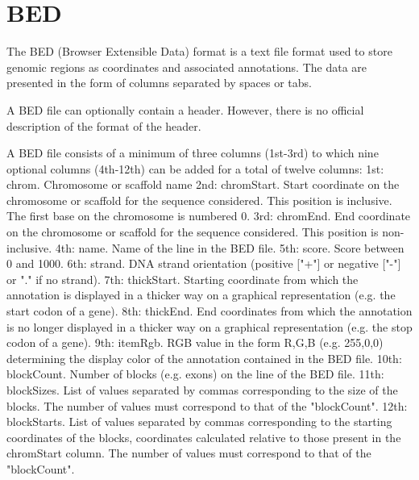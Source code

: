 \documentclass[11pt]{article}
\begin{document}
\section{BED}
The BED (Browser Extensible Data) format is a text file format used to store genomic regions as coordinates and associated annotations. 
The data are presented in the form of columns separated by spaces or tabs.

\newline

A BED file can optionally contain a header. 
However, there is no official description of the format of the header.

\newline

A BED file consists of a minimum of three columns (1st-3rd) to which nine optional columns (4th-12th) can be added for a total of twelve columns:
\newline
1st: chrom. 
Chromosome or scaffold name
\newline
2nd: chromStart. 
Start coordinate on the chromosome or scaffold for the sequence considered. 
This position is inclusive. 
The first base on the chromosome is numbered 0.
\newline
3rd: chromEnd. 
End coordinate on the chromosome or scaffold for the sequence considered. 
This position is non-inclusive.
\newline
4th: name. 
Name of the line in the BED file.
\newline
5th: score. 
Score between 0 and 1000.
\newline
6th: strand. 
DNA strand orientation (positive ["+"] or negative ["-"] or "." if no strand).
\newline
7th: thickStart. 
Starting coordinate from which the annotation is displayed in a thicker way on a graphical representation (e.g. the start codon of a gene).
\newline
8th: thickEnd. 
End coordinates from which the annotation is no longer displayed in a thicker way on a graphical representation (e.g. the stop codon of a gene).
\newline
9th: itemRgb. 
RGB value in the form R,G,B (e.g. 255,0,0) determining the display color of the annotation contained in the BED file.
\newline
10th: blockCount. 
Number of blocks (e.g. exons) on the line of the BED file.
\newline
11th: blockSizes. 
List of values separated by commas corresponding to the size of the blocks. 
The number of values must correspond to that of the "blockCount".
\newline
12th: blockStarts. 
List of values separated by commas corresponding to the starting coordinates of the blocks, coordinates calculated relative to those present in the chromStart column. 
The number of values must correspond to that of the "blockCount".
\end{document}
